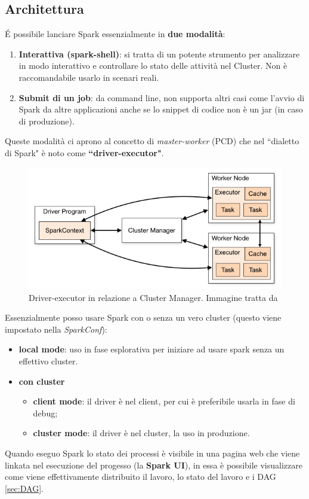 \documentclass[12pt,italian]{article}
\begin{document}
\subsection{Architettura}
É possibile lanciare Spark essenzialmente in \textbf{due modalità}:
\begin{enumerate}
	\item \textbf{Interattiva (spark-shell)}: si tratta di un potente strumento per analizzare in modo interattivo e controllare lo stato delle attività nel Cluster. Non è raccomandabile usarlo in scenari reali.
	\item \textbf{Submit di un job}: da command line, non supporta altri casi come l'avvio di Spark da altre applicazioni anche se lo snippet di codice non è un jar (in caso di produzione).
\end{enumerate}
Queste modalità ci aprono al concetto di \textit{master-worker} (PCD) che nel ``dialetto di Spark" è noto come \textbf{``driver-executor"}.
\begin{figure}
	\centering 
	\includegraphics[width=0.8\linewidth]{img/cluster-overview.png}
	\caption{Driver-executor in relazione a Cluster Manager. Immagine tratta da \cite{spark}}
	\label{fig:driverexecutor}
\end{figure}
Essenzialmente posso usare Spark con o senza un vero cluster (questo viene impostato nella \textit{SparkConf}):
\begin{itemize}
	\item \textbf{local mode}: uso in fase esplorativa per iniziare ad usare spark senza un effettivo cluster.
	\item \textbf{con cluster}
	\begin{itemize}
		\item \textbf{client mode}: il driver è nel client, per cui è preferibile usarla in fase di debug;
		\item \textbf{cluster mode}: il driver è nel cluster, la uso in produzione.
	\end{itemize}
\end{itemize}
Quando eseguo Spark lo stato dei processi è visibile in una pagina web che viene linkata nel esecuzione del progesso (la \textbf{Spark UI}), in essa è possibile visualizzare come viene effettivamente distribuito il lavoro, lo stato del lavoro e i DAG \ref{sec:DAG}. 
\end{document}

